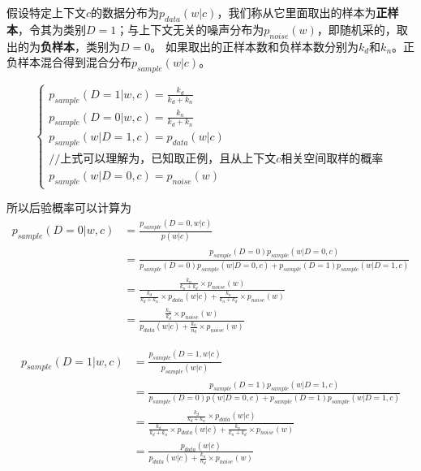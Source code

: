 \documentclass{article}
\begin{document}
假设特定上下文$c$的数据分布为$p_{data}(w|c)$，我们称从它里面取出的样本为\textbf{正样本}，令其为类别$D=1$；与上下文无关的噪声分布为$p_{noise}(w)$，即随机采的，取出的为\textbf{负样本}，类别为$D=0$。
如果取出的正样本数和负样本数分别为$k_d$和$k_n$。正负样本混合得到混合分布$p_{sample}(w|c)$。

\begin{equation}
    \begin{cases}
        p_{sample}(D=1|w,c)=\frac{k_d}{k_d+k_n}\\
        p_{sample}(D=0|w,c)=\frac{k_n}{k_d+k_n}\\
        p_{sample}(w|D=1,c)=p_{data}(w|c) \\
        //\text{上式可以理解为，已知取正例，且从上下文$c$相关空间取样的概率}\\
        p_{sample}(w|D=0,c)=p_{noise}(w)
    \end{cases}
\end{equation}

所以后验概率可以计算为
\begin{equation}
    \begin{split}
        p_{sample}(D=0|w,c)&=\frac{p_{sample}(D=0,w|c)}{p(w|c)}\\
        &= \frac{p_{sample}(D=0)p_{sample}(w|D=0,c)}{p_{sample}(D=0)p_{sample}(w|D=0,c)+p_{sample}(D=1)p_{sample}(w|D=1,c)}\\
        &= \frac{\frac{k_n}{k_n+k_d} \times p_{noise}(w)}{\frac{k_d}{k_d+k_n} \times p_{data}(w|c) + \frac{k_n}{k_n+k_d} \times p_{noise}(w)} \\
        &= \frac{\frac{k_n}{k_d} \times p_{noise}(w)}{p_{data}(w|c)+\frac{k_n}{n_d} \times p_{noise}(w)}
    \end{split}
\end{equation}


\begin{equation}
    \begin{split}
        p_{sample}(D=1|w,c)&=\frac{p_{sample}(D=1,w|c)}{p_{sample}(w|c)}\\
        &= \frac{p_{sample}(D=1) p_{sample}(w|D=1,c)}{p_{sample}(D=0)p(w|D=0,c) + p_{sample}(D=1)p_{sample}(w|D=1,c)}\\
        &= \frac{\frac{k_d}{k_d+k_n}\times p_{data}(w|c)}{\frac{k_d}{k_d+k_n} \times p_{data}(w|c) + \frac{k_n}{k_n+k_d} \times p_{noise}(w)}\\
        &= \frac{p_{data}(w|c)}{p_{data}(w|c)+\frac{k_n}{n_d} \times p_{noise}(w)}
    \end{split}
\end{equation}
\end{document}
